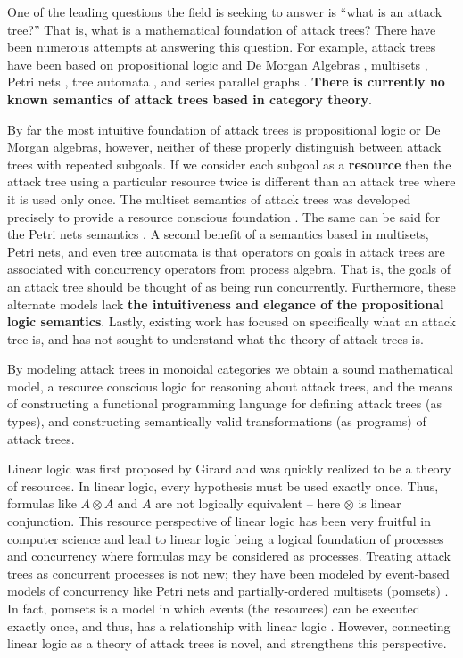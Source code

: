 \documentclass{llncs}
\begin{document}
One of the leading questions the field is seeking to answer is ``what
is an attack tree?''  That is, what is a mathematical foundation of
attack trees? There have been numerous attempts at answering this
question.  For example, attack trees have been based on propositional
logic and De Morgan Algebras
\cite{Kordy:2014,Kordy:2012,Pietre-Cambacedes:2010}, multisets
\cite{Mauw:2006}, Petri nets \cite{McDermott:2001}, tree automata
\cite{Camtepe:2007}, and series parallel graphs
\cite{Jhawar:2015}. \textbf{There is currently no known semantics of
  attack trees based in category theory}.

By far the most intuitive foundation of attack trees is propositional
logic or De Morgan algebras, however, neither of these properly
distinguish between attack trees with repeated subgoals.  If we
consider each subgoal as a \textbf{resource} then the attack tree
using a particular resource twice is different than an attack tree
where it is used only once.  The multiset semantics of attack trees
was developed precisely to provide a resource conscious foundation
\cite{Mauw:2006}. The same can be said for the Petri nets semantics
\cite{McDermott:2001}.  A second benefit of a semantics based in
multisets, Petri nets, and even tree automata is that operators on
goals in attack trees are associated with concurrency operators from
process algebra.  That is, the goals of an attack tree should be
thought of as being run concurrently.  Furthermore, these alternate
models lack \textbf{the intuitiveness and elegance of the
  propositional logic semantics}.  Lastly, existing work has focused
on specifically what an attack tree is, and has not sought to
understand what the theory of attack trees is.

By modeling attack trees in monoidal categories we obtain a sound
mathematical model, a resource conscious logic for reasoning about
attack trees, and the means of constructing a functional programming
language for defining attack trees (as types), and constructing
semantically valid transformations (as programs) of attack trees.

Linear logic was first proposed by Girard \cite{Girard:1987} and was
quickly realized to be a theory of resources.  In linear logic, every
hypothesis must be used exactly once.  Thus, formulas like $A \otimes
A$ and $A$ are not logically equivalent -- here $\otimes$ is linear
conjunction.  This resource perspective of linear logic has been very
fruitful in computer science and lead to linear logic being a logical
foundation of processes and concurrency where formulas may be
considered as processes.  Treating attack trees as concurrent
processes is not new; they have been modeled by event-based models of
concurrency like Petri nets and partially-ordered multisets (pomsets)
\cite{Jhawar:2015,Mauw:2006}.  In fact, pomsets is a model in which
events (the resources) can be executed exactly once, and thus, has a
relationship with linear logic \cite{Retore:1997}.  However,
connecting linear logic as a theory of attack trees is novel, and
strengthens this perspective.
\end{document}
